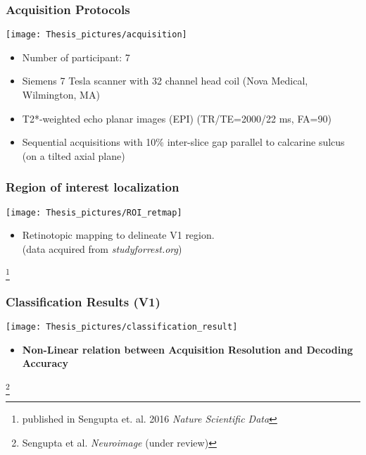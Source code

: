 \documentclass{beamer}
\newcommand\blfootnote[1]{%
  \begingroup
  \renewcommand\thefootnote{}\footnote{#1}%
  \addtocounter{footnote}{-1}%
  \endgroup
}
\begin{document}
	\begin{frame}
		\frametitle{Acquisition Protocols}
		\begin{center}
			\texttt{[image: Thesis\_pictures/acquisition]}
		\end{center}
		\begin{itemize}
		 \item Number of participant: 7		
		 \item Siemens 7 Tesla scanner with 32 channel head coil (Nova Medical, Wilmington, MA)
		 \item T2*-weighted echo planar images (EPI) (TR/TE=2000/22 ms, FA=90\textdegree)
		 \item Sequential acquisitions with 10\% inter-slice gap parallel to calcarine sulcus (on a tilted 
		 axial plane)
		\end{itemize}  
	\end{frame} 

  
 
    
  \begin{frame}
    \frametitle{Region of interest localization}
        \begin{center}
            \texttt{[image: Thesis\_pictures/ROI\_retmap]}
        \end{center}
        \begin{itemize}
			\item Retinotopic mapping to delineate V1 region. \\(data acquired from \textit{studyforrest.org})
        \end{itemize} 
        \blfootnote{published in Sengupta et. al. 2016 \textit{Nature Scientific Data}}
    \end{frame} 
    
  \begin{frame}
    \frametitle{Classification Results (V1)}
        \begin{center}
            \texttt{[image: Thesis\_pictures/classification\_result]}
        \end{center}
        \begin{itemize}
			\item \textbf{Non-Linear relation between Acquisition Resolution and Decoding Accuracy}
        \end{itemize} 
        \blfootnote{Sengupta et al. \textit{Neuroimage} (under review)}
    \end{frame}

\end{document}
